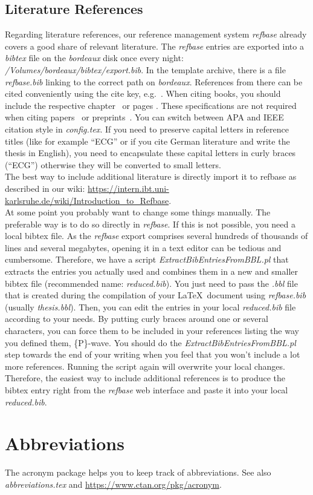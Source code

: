 \subsection{Literature References}
\label{sec:meth:references:literature}
Regarding literature references, our reference management system \textit{refbase} already covers a good share of relevant literature. The \textit{refbase} entries are exported into a \textit{bibtex} file on the \textit{bordeaux} disk once every night: \textit{/Volumes/bordeaux/bibtex/export.bib}. In the template archive, there is a file \textit{refbase.bib} linking to the correct path on \textit{bordeaux}. References from there can be cited conveniently using the cite key, e.g.~\cite{courtemanche98}. When citing books, you should include the respective chapter~\cite[Chap. 5]{belytschko00} or pages  \cite[pp. 239--240]{belytschko00}. These specifications are not required when citing papers~\cite{riedel02} or preprints~\cite{schuler2021reducing}. You can switch between APA and IEEE citation style in \textit{config.tex}. If you need to preserve capital letters in reference titles (like for example ``ECG'' or if you cite German literature and write the thesis in English), you need to encapsulate these capital letters in curly braces (``{ECG}'') otherwise they will be converted to small letters.\\
The best way to include additional literature is directly import it to refbase as described in our wiki: \url{https://intern.ibt.uni-karlsruhe.de/wiki/Introduction_to_Refbase}.\\
At some point you probably want to change some things manually. The preferable way is to do so directly in \textit{refbase}. If this is not possible, you need a local bibtex file. As the \textit{refbase} export comprises several hundreds of thousands of lines and several megabytes, opening it in a text editor can be tedious and cumbersome. Therefore, we have a script \textit{ExtractBibEntriesFromBBL.pl} that extracts the entries you actually used and combines them in a new and smaller bibtex file (recommended name: \textit{reduced.bib}). You just need to pass the \textit{.bbl} file that is created during the compilation of your \LaTeX\ document using \textit{refbase.bib} (usually \textit{thesis.bbl}). Then, you can edit the entries in your local \textit{reduced.bib} file according to your needs. By putting curly braces around one or several characters, you can force them to be included in your references listing the way you defined them, \eg \{P\}-wave. You should do the \textit{ExtractBibEntriesFromBBL.pl} step towards the end of your writing when you feel that you won't include a lot more references. Running the script again will overwrite your local changes. Therefore, the easiest way to include additional references is to produce the bibtex entry right from the \textit{refbase} web interface and paste it into your local \textit{reduced.bib}.

\section{Abbreviations}
The acronym package helps you to keep track of abbreviations. See also \textit{abbreviations.tex} and \url{https://www.ctan.org/pkg/acronym}.
\cite{EKGO}
